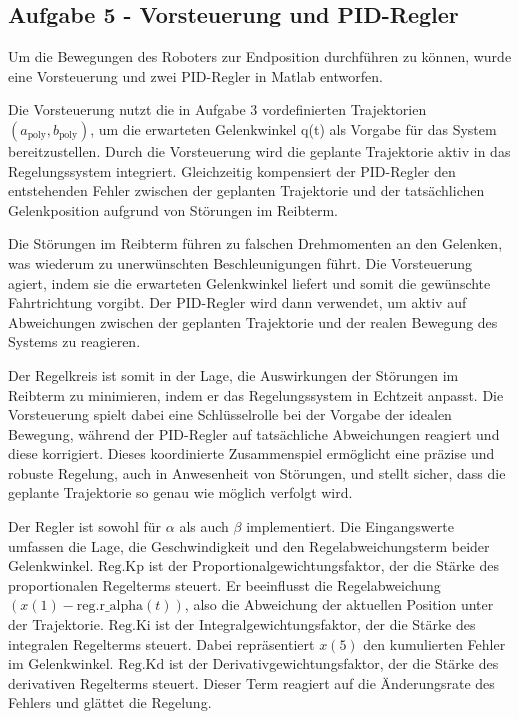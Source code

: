\subsection*{Aufgabe 5 - Vorsteuerung und PID-Regler}

Um die Bewegungen des Roboters zur Endposition durchführen zu können, wurde eine Vorsteuerung und zwei PID-Regler in Matlab entworfen.

Die Vorsteuerung nutzt die in Aufgabe 3 vordefinierten Trajektorien $(a_{\text{poly}}, b_{\text{poly}})$, um die erwarteten Gelenkwinkel q(t) als Vorgabe für das System bereitzustellen. Durch die Vorsteuerung wird die geplante Trajektorie aktiv in das Regelungssystem integriert. Gleichzeitig kompensiert der PID-Regler den entstehenden Fehler zwischen der geplanten Trajektorie und der tatsächlichen Gelenkposition aufgrund von Störungen im Reibterm.

Die Störungen im Reibterm führen zu falschen Drehmomenten an den Gelenken, was wiederum zu unerwünschten Beschleunigungen führt. Die Vorsteuerung agiert, indem sie die erwarteten Gelenkwinkel liefert und somit die gewünschte Fahrtrichtung vorgibt. Der PID-Regler wird dann verwendet, um aktiv auf Abweichungen zwischen der geplanten Trajektorie und der realen Bewegung des Systems zu reagieren.

Der Regelkreis ist somit in der Lage, die Auswirkungen der Störungen im Reibterm zu minimieren, indem er das Regelungssystem in Echtzeit anpasst. Die Vorsteuerung spielt dabei eine Schlüsselrolle bei der Vorgabe der idealen Bewegung, während der PID-Regler auf tatsächliche Abweichungen reagiert und diese korrigiert. Dieses koordinierte Zusammenspiel ermöglicht eine präzise und robuste Regelung, auch in Anwesenheit von Störungen, und stellt sicher, dass die geplante Trajektorie so genau wie möglich verfolgt wird.


Der Regler ist sowohl für \(\alpha\) als auch \(\beta\) implementiert. Die Eingangswerte umfassen die Lage, die Geschwindigkeit und den Regelabweichungsterm beider Gelenkwinkel. \(\text{Reg.Kp}\) ist der Proportionalgewichtungsfaktor, der die Stärke des proportionalen Regelterms steuert. Er beeinflusst die Regelabweichung \((x(1) - \text{reg.r\_alpha}(t))\), also die Abweichung der aktuellen Position unter der Trajektorie. \(\text{Reg.Ki}\) ist der Integralgewichtungsfaktor, der die Stärke des integralen Regelterms steuert. Dabei repräsentiert \(x(5)\) den kumulierten Fehler im Gelenkwinkel. \(\text{Reg.Kd}\) ist der Derivativgewichtungsfaktor, der die Stärke des derivativen Regelterms steuert. Dieser Term reagiert auf die Änderungsrate des Fehlers und glättet die Regelung.


